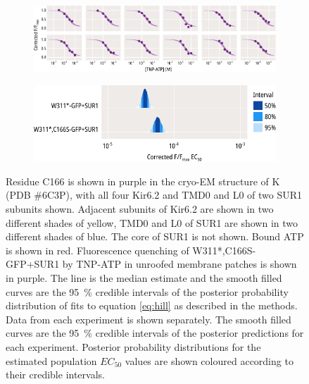 \begin{figure}[hbtp]
\begin{subfigure}[t]{0.45\textwidth}
	\end{subfigure}
	\vfill
	\begin{subfigure}[t]{0.9\textwidth}
		\caption{}\label{ch5fig:c166s_indfits}
		\centering
		\includegraphics[width=\textwidth]{c166s_3.pdf}
	\end{subfigure}
	\vfill
	\begin{subfigure}[t]{0.7\textwidth}
		\caption{}\label{ch5fig:c166s_params}
		\centering
		\includegraphics[width=\textwidth]{c166s_4.pdf}
	\end{subfigure}
	\caption[C166S does not alter nucleotide binding]{
	 Residue C166 is shown in purple in the cryo-EM structure of K\ATP{} (PDB \#6C3P), with all four Kir6.2 and TMD0 and L0 of two SUR1 subunits shown.
	Adjacent subunits of Kir6.2 are shown in two different shades of yellow, TMD0 and L0 of SUR1 are shown in two different shades of blue.
	The core of SUR1 is not shown.
	Bound ATP is shown in red.
	 Fluorescence quenching of W311*,C166S-GFP+SUR1 by TNP-ATP in unroofed membrane patches is shown in purple.
	The line is the median estimate and the smooth filled curves are the \SI{95}{\percent} credible intervals of the posterior probability distribution of fits to equation \ref{eq:hill} as described in the methods.
	 Data from each experiment is shown separately.
	The smooth filled curves are the \SI{95}{\percent} credible intervals of the posterior predictions for each experiment.
	 Posterior probability distributions for the estimated population $EC_{50}$ values are shown coloured according to their credible intervals.
	}\label{ch5fig:c166s_1}
\end{figure}

